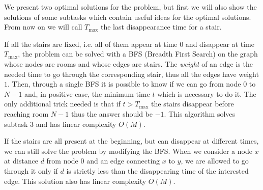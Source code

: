 \setcounter{figure}{0}


\pagecolor{backcolor}

\newcommand{\inizio}{\ensuremath{\mathrm{start}}}
\newcommand{\fine}{\ensuremath{\mathrm{end}}}


\Solution

We present two optimal solutions for the problem, but first we will also show the solutions of some subtasks which contain useful ideas for the optimal solutions. From now on we will call $T_{\max}$ the last disappearance time for a stair. 


\ArchiFissi

If all the stairs are fixed, i.e. all of them appear at time $0$ and disappear at time $T_{\max}$, the problem can be solved with a BFS (Breadth First Search) on the graph whose nodes are rooms and whose edges are stairs. The \emph{weight} of an edge is the needed time to go through the corresponding stair, thus all the edges have weight $1$. Then, through a single BFS it is possible to know if we can go from node $0$ to $N-1$ and, in positive case, the minimum time $t$ which is necessary to do it. The only additional trick needed is that if $t > T_{\max}$ the stairs disappear before reaching room $N-1$ thus the answer should be $-1$. This algorithm solves subtask 3 and has linear complexity $O(M)$.


\ScompaionoSolo

If the stairs are all present at the beginning, but can disappear at different times, we can still solve the problem by modifying the BFS. When we consider a node $x$ at distance $d$ from node $0$ and an edge connecting $x$ to $y$, we are allowed to go through it only if $d$ is strictly less than the disappearing time of the interested edge. This solution also has linear complexity $O(M)$.


